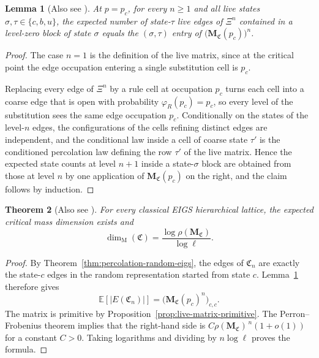 \documentclass[scheme=plain,11pt]{ctexart}
\newtheorem{theorem}{Theorem}[section]
\newtheorem{lemma}[theorem]{Lemma}
\theoremstyle{definition}
\theoremstyle{remark}
\newcommand{\dimmass}{\dim_{\mathrm M}}
\begin{document}
\begin{lemma}[Also see \cite{alves2026percolation}]\label{thm:mass-transfer-power}
At $p=p_c$, for every $n\ge1$ and all live states $\sigma,\tau\in\{c,b,u\}$, the expected number of state-$\tau$ live edges of $\Xi^{n}$ contained in a level-zero block of state $\sigma$ equals the $(\sigma,\tau)$ entry of $\bigl(\mathbf M_{\mathfrak C}(p_c)\bigr)^{n}$.
\end{lemma}

\begin{proof}
The case $n=1$ is the definition of the live matrix, since at the critical point the edge occupation entering a single substitution cell is $p_c$.

Replacing every edge of $\Xi^{n}$ by a rule cell at occupation $p_c$ turns each cell into a coarse edge that is open with probability $\varphi_R(p_c)=p_c$, so every level of the substitution sees the same edge occupation $p_c$.
Conditionally on the states of the level-$n$ edges, the configurations of the cells refining distinct edges are independent, and the conditional law inside a cell of coarse state $\tau'$ is the conditioned percolation law defining the row $\tau'$ of the live matrix.
Hence the expected state counts at level $n+1$ inside a state-$\sigma$ block are obtained from those at level $n$ by one application of $\mathbf M_{\mathfrak C}(p_c)$ on the right, and the claim follows by induction.
\end{proof}


\begin{theorem}[Also see \cite{alves2026percolation}]\label{thm:critical-mass-dimension}
For every classical EIGS hierarchical lattice, the expected critical mass dimension exists and
\[
 \dimmass(\mathfrak C)=\frac{\log\rho(\mathbf M_{\mathfrak C})}{\log\ell}.
\]
\end{theorem}
\begin{proof}
By Theorem~\ref{thm:percolation-random-eigs}, the edges of $\mathfrak C_n$ are exactly the state-$c$ edges in the random representation started from state $c$.
Lemma~\ref{thm:mass-transfer-power} therefore gives
\[
 \mathbb E[|E(\mathfrak C_n)|]
 =\bigl(\mathbf M_{\mathfrak C}(p_c)^n\bigr)_{c,c}.
\]
The matrix is primitive by Proposition~\ref{prop:live-matrix-primitive}.
The Perron--Frobenius theorem implies that the right-hand side is $C\rho(\mathbf M_{\mathfrak C})^{\,n}(1+o(1))$ for a constant $C>0$.
Taking logarithms and dividing by $n\log\ell$ proves the formula.
\end{proof}
\end{document}
